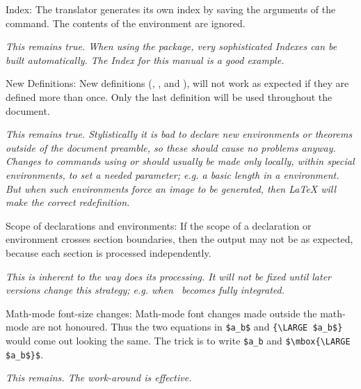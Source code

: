 \begin{htmllist}
\item [Index: ]
The translator generates its own index by saving the arguments  of
the  command. The contents of the 
environment are ignored.
\begin{changebar}
\newline\textit
{This remains true. When using the  package,
very sophisticated Indexes can be built automatically.
The Index for this manual is a good example.}
\end{changebar}

\item[New Definitions:\index{extensions!definitions} ]
New definitions (, ,
 and ),
will not work as expected if they are defined more than once.
Only the last definition will be used throughout the document.
\begin{changebar}
\newline\textit
{This remains true. Stylistically it is bad to declare new
environments or theorems outside of the document preamble,
so these should cause no problems anyway.\html{\\}
Changes to commands using  or 
should usually be made only locally, within special environments,
to set a needed parameter;
e.g. a basic length in a  environment.
But when such environments force an image to be generated,
then \LaTeX{} will make the correct redefinition.}
\end{changebar}

\item [Scope of declarations and environments: ]
If the scope of a declaration or environment crosses section
boundaries, then the output may not be as expected, because each
section is processed independently.
\begin{changebar}
\newline\textit
{This is inherent to the way \latextohtml{} does its processing.
It will not be fixed until later versions change this strategy;
e.g. when \latextohtmlNG\ becomes fully integrated.}
\end{changebar}

\item [Math-mode font-size changes: ]  Math-mode font changes
made outside the math-mode are not honoured.  Thus the two equations
in \verb|$a_b$| and \verb|{\LARGE $a_b$}|
would come out looking the same.  The trick is to write
\verb|$a_b| and \verb|$\mbox{\LARGE $a_b$}$|.
\begin{changebar}
\newline\textit
{This remains. The work-around is effective.}
\end{changebar}
\end{htmllist}



